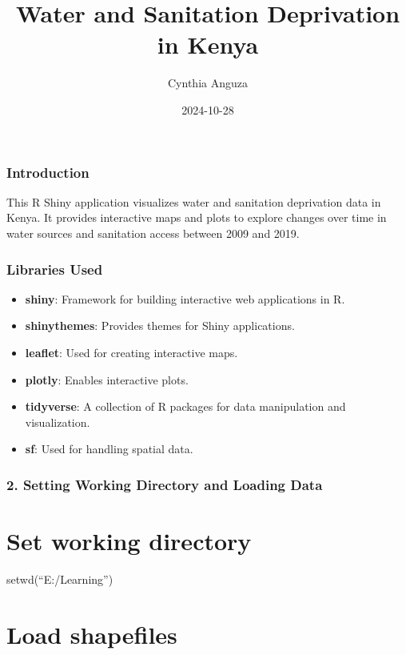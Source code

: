 \documentclass[
]{article}
\title{Water and Sanitation Deprivation in Kenya}
\author{Cynthia Anguza}
\date{2024-10-28}
\providecommand{\tightlist}{%
  \setlength{\itemsep}{0pt}\setlength{\parskip}{0pt}}
\begin{document}
\maketitle

\subsubsection{Introduction}\label{introduction}

This R Shiny application visualizes water and sanitation deprivation
data in Kenya. It provides interactive maps and plots to explore changes
over time in water sources and sanitation access between 2009 and 2019.

\subsubsection{Libraries Used}\label{libraries-used}

\begin{itemize}
\tightlist
\item
  \textbf{shiny}: Framework for building interactive web applications in
  R.
\item
  \textbf{shinythemes}: Provides themes for Shiny applications.
\item
  \textbf{leaflet}: Used for creating interactive maps.
\item
  \textbf{plotly}: Enables interactive plots.
\item
  \textbf{tidyverse}: A collection of R packages for data manipulation
  and visualization.
\item
  \textbf{sf}: Used for handling spatial data.
\end{itemize}

\subsubsection{2. Setting Working Directory and Loading
Data}\label{setting-working-directory-and-loading-data}

\section{Set working directory}\label{set-working-directory}

setwd(``E:/Learning'')

\section{Load shapefiles}\label{load-shapefiles}
\end{document}
